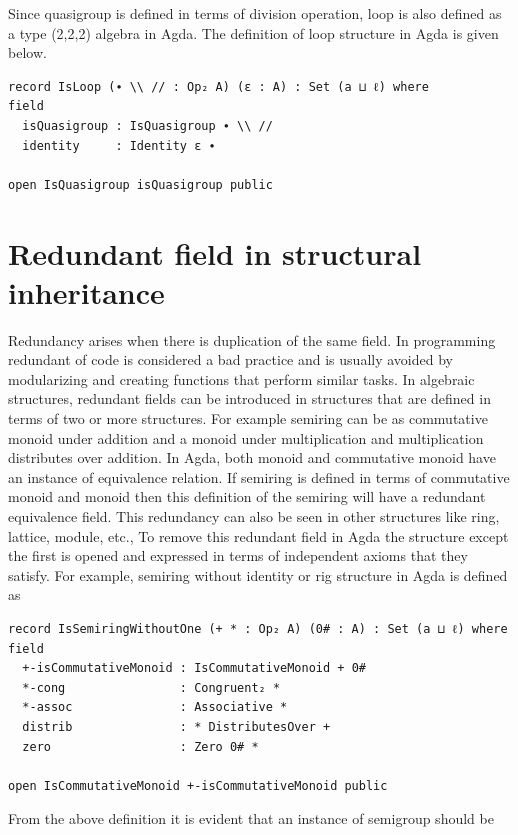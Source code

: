 Since quasigroup is defined in terms of division operation, loop is also defined
as a type (2,2,2) algebra in Agda. The definition of loop structure in Agda is
given below.\\

\begin{verbatim}
record IsLoop (∙ \\ // : Op₂ A) (ε : A) : Set (a ⊔ ℓ) where
field
  isQuasigroup : IsQuasigroup ∙ \\ //
  identity     : Identity ε ∙

open IsQuasigroup isQuasigroup public
\end{verbatim}

\section{Redundant field in structural inheritance}
Redundancy arises when there is duplication of the same field. In programming
redundant of code is considered a bad practice and is usually avoided by
modularizing and creating functions that perform similar tasks. In algebraic
structures, redundant fields can be introduced in structures that are defined in
terms of two or more structures. For example semiring can be as commutative
monoid under addition and a monoid under multiplication and multiplication
distributes over addition. In Agda, both monoid and commutative monoid have an
instance of equivalence relation. If semiring is defined in terms of commutative
monoid and monoid then this definition of the semiring will have a redundant
equivalence field. This redundancy can also be seen in other structures like
ring, lattice, module, etc., To remove this redundant field in Agda the
structure except the first is opened and expressed in terms of independent
axioms that they satisfy. For example, semiring without identity or rig
structure in Agda is defined as \\
\begin{verbatim}
record IsSemiringWithoutOne (+ * : Op₂ A) (0# : A) : Set (a ⊔ ℓ) where
field
  +-isCommutativeMonoid : IsCommutativeMonoid + 0#
  *-cong                : Congruent₂ *
  *-assoc               : Associative *
  distrib               : * DistributesOver +
  zero                  : Zero 0# *

open IsCommutativeMonoid +-isCommutativeMonoid public
\end{verbatim}
From the above definition it is evident that an instance of semigroup should be
